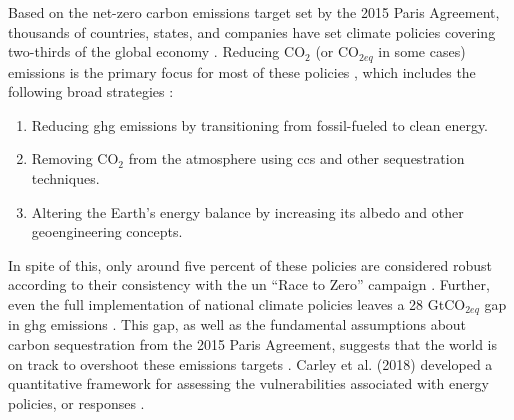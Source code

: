 \noindent\hrulefill

Based on the net-zero carbon emissions target set by the 2015 Paris Agreement,
thousands of countries, states, and companies have set climate policies covering
two-thirds of the global economy \cite{hale_assessing_2022}. Reducing CO$_2$ (or
CO$_{2eq}$ in some cases) emissions is the primary focus for most of these
policies \cite{fawzy_strategies_2020, roelfsema_taking_2020,
hale_assessing_2022}, which includes the following broad strategies
\cite{fawzy_strategies_2020}:
\begin{enumerate}
    \item Reducing \ac{ghg} emissions by transitioning from fossil-fueled to
    clean energy.
    \item Removing CO$_2$ from the atmosphere using \ac{ccs} and other
    sequestration techniques.
    \item Altering the Earth's energy balance by increasing its albedo and other
    geoengineering concepts.
\end{enumerate}

In spite of this, only around five percent of these policies are considered
robust according to their consistency with the \ac{un} ``Race to Zero'' campaign
\cite{hale_assessing_2022}. Further, even the full implementation of national
climate policies leaves a 28 GtCO$_{2eq}$ gap in \ac{ghg} emissions
\cite{roelfsema_taking_2020}. This gap, as well as the fundamental assumptions
about carbon sequestration from the 2015 Paris Agreement, suggests that the
world is on track to overshoot these emissions targets
\cite{roelfsema_taking_2020,taylor_managing_2021}. Carley et al. (2018)
developed a quantitative framework for assessing the vulnerabilities associated
with energy policies, or responses \cite{carley_framework_2018}.

\noindent\hrulefill

